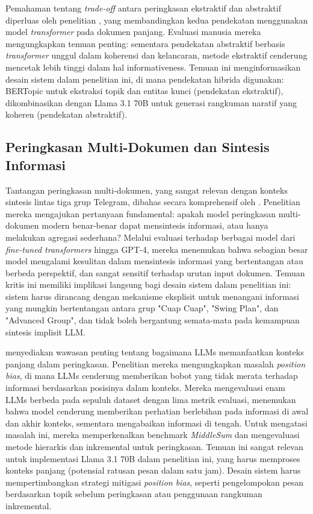 Pemahaman tentang \textit{trade-off} antara peringkasan ekstraktif dan abstraktif diperluas oleh penelitian \textcite{pilault2020}, yang membandingkan kedua pendekatan menggunakan model \textit{transformer} pada dokumen panjang. Evaluasi manusia mereka mengungkapkan temuan penting: sementara pendekatan abstraktif berbasis \textit{transformer} unggul dalam koherensi dan kelancaran, metode ekstraktif cenderung mencetak lebih tinggi dalam hal informativeness. Temuan ini menginformasikan desain sistem dalam penelitian ini, di mana pendekatan hibrida digunakan: BERTopic untuk ekstraksi topik dan entitas kunci (pendekatan ekstraktif), dikombinasikan dengan Llama 3.1 70B untuk generasi rangkuman naratif yang koheren (pendekatan abstraktif).

\subsection{Peringkasan Multi-Dokumen dan Sintesis Informasi}

Tantangan peringkasan multi-dokumen, yang sangat relevan dengan konteks sintesis lintas tiga grup Telegram, dibahas secara komprehensif oleh \textcite{deyoung2024}. Penelitian mereka mengajukan pertanyaan fundamental: apakah model peringkasan multi-dokumen modern benar-benar dapat mensintesis informasi, atau hanya melakukan agregasi sederhana? Melalui evaluasi terhadap berbagai model dari \textit{fine-tuned transformers} hingga GPT-4, mereka menemukan bahwa sebagian besar model mengalami kesulitan dalam mensintesis informasi yang bertentangan atau berbeda perspektif, dan sangat sensitif terhadap urutan input dokumen. Temuan kritis ini memiliki implikasi langsung bagi desain sistem dalam penelitian ini: sistem harus dirancang dengan mekanisme eksplisit untuk menangani informasi yang mungkin bertentangan antara grup "Cuap Cuap", "Swing Plan", dan "Advanced Group", dan tidak boleh bergantung semata-mata pada kemampuan sintesis implisit LLM.

\textcite{ravaut2024} menyediakan wawasan penting tentang bagaimana LLMs memanfaatkan konteks panjang dalam peringkasan. Penelitian mereka mengungkapkan masalah \textit{position bias}, di mana LLMs cenderung memberikan bobot yang tidak merata terhadap informasi berdasarkan posisinya dalam konteks. Mereka mengevaluasi enam LLMs berbeda pada sepuluh dataset dengan lima metrik evaluasi, menemukan bahwa model cenderung memberikan perhatian berlebihan pada informasi di awal dan akhir konteks, sementara mengabaikan informasi di tengah. Untuk mengatasi masalah ini, mereka memperkenalkan benchmark \textit{MiddleSum} dan mengevaluasi metode hierarkis dan inkremental untuk peringkasan. Temuan ini sangat relevan untuk implementasi Llama 3.1 70B dalam penelitian ini, yang harus memproses konteks panjang (potensial ratusan pesan dalam satu jam). Desain sistem harus mempertimbangkan strategi mitigasi \textit{position bias}, seperti pengelompokan pesan berdasarkan topik sebelum peringkasan atau penggunaan rangkuman inkremental.

